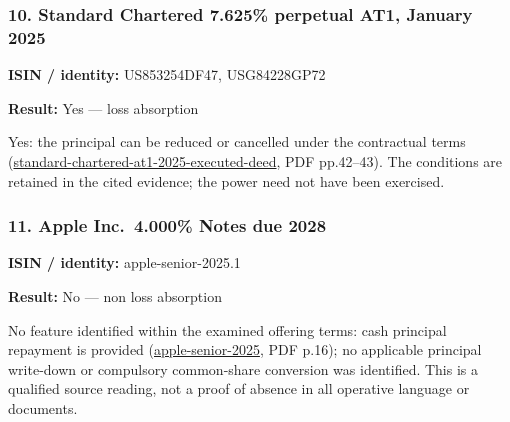 \documentclass[
  11pt,
]{article}
\begin{document}
\begin{minipage}{\linewidth}

\hypertarget{standard-chartered-7.625-perpetual-at1-january-2025}{%
\subsubsection{10. Standard Chartered 7.625\% perpetual AT1, January
2025}\label{standard-chartered-7.625-perpetual-at1-january-2025}}

\textbf{ISIN / identity:} US853254DF47, USG84228GP72

\textbf{Result:} Yes --- loss absorption

Yes: the principal can be reduced or cancelled under the contractual
terms
(\href{https://www.sc.com/en/uploads/sites/66/content/docs/SCPLC-AT1-2025_Trust-Deed_EXECUTED3206549387.1.pdf}{standard-chartered-at1-2025-executed-deed},
PDF pp.42--43). The conditions are retained in the cited evidence; the
power need not have been exercised.

\end{minipage}
\par\addvspace{1.1em}

\begin{minipage}{\linewidth}

\hypertarget{apple-inc.-4.000-notes-due-2028}{%
\subsubsection{11. Apple Inc.~4.000\% Notes due
2028}\label{apple-inc.-4.000-notes-due-2028}}

\textbf{ISIN / identity:} apple-senior-2025.1

\textbf{Result:} No --- non loss absorption

No feature identified within the examined offering terms: cash principal
repayment is provided
(\href{https://d18rn0p25nwr6d.cloudfront.net/CIK-0000320193/d9065b65-eeb8-439b-97fc-be1d38ce0d2e.pdf}{apple-senior-2025},
PDF p.16); no applicable principal write-down or compulsory common-share
conversion was identified. This is a qualified source reading, not a
proof of absence in all operative language or documents.

\end{minipage}
\par\addvspace{1.1em}
\end{document}
